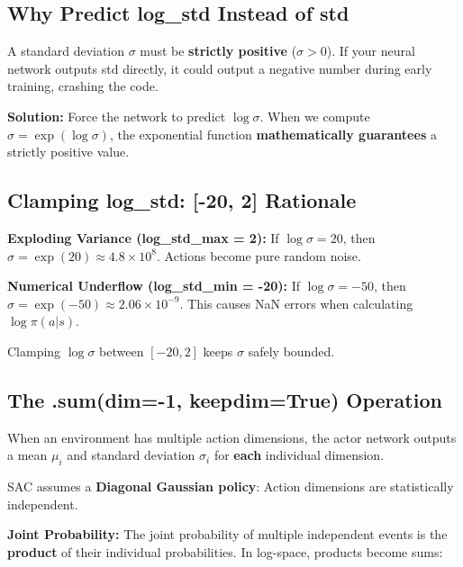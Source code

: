 \documentclass[12pt,a4paper]{article}
\theoremstyle{noteplain}
\theoremstyle{noteexercise}
\begin{document}
\subsection{Why Predict log\_std Instead of std}\label{ssec:log-std}



A standard deviation $\sigma$ must be \textbf{strictly positive} ($\sigma > 0$). If your neural network outputs std directly, it could output a negative number during early training, crashing the code.

\textbf{Solution:} Force the network to predict $\log\sigma$. When we compute $\sigma = \exp(\log\sigma)$, the exponential function \textbf{mathematically guarantees} a strictly positive value.



\subsection{Clamping log\_std: [-20, 2] Rationale}\label{ssec:clamp}



\textbf{Exploding Variance (log\_std\_max = 2):} If $\log\sigma = 20$, then $\sigma = \exp(20) \approx 4.8 \times 10^8$. Actions become pure random noise.

\textbf{Numerical Underflow (log\_std\_min = -20):} If $\log\sigma = -50$, then $\sigma = \exp(-50) \approx 2.06 \times 10^{-9}$. This causes NaN errors when calculating $\log\pi(a|s)$.

Clamping $\log\sigma$ between $[-20, 2]$ keeps $\sigma$ safely bounded.



\subsection{The .sum(dim=-1, keepdim=True) Operation}\label{ssec:sum-dim}



When an environment has multiple action dimensions, the actor network outputs a mean $\mu_i$ and standard deviation $\sigma_i$ for \textbf{each} individual dimension.

SAC assumes a \textbf{Diagonal Gaussian policy}: Action dimensions are statistically independent.

\textbf{Joint Probability:} The joint probability of multiple independent events is the \textbf{product} of their individual probabilities. In log-space, products become sums:
\end{document}
